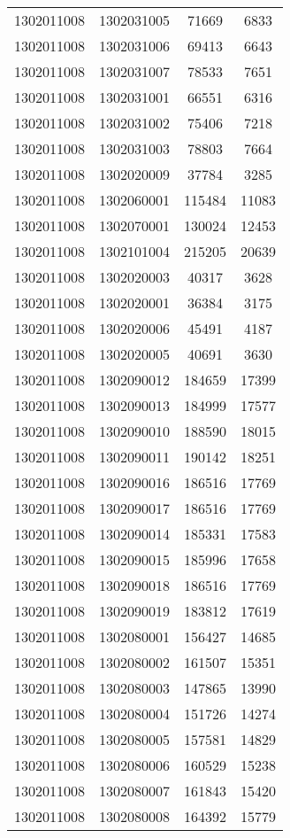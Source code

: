 \begin{longtable}{llcc}
1302011008 & 1302031005 & 71669 & 6833\\
1302011008 & 1302031006 & 69413 & 6643\\
1302011008 & 1302031007 & 78533 & 7651\\
1302011008 & 1302031001 & 66551 & 6316\\
1302011008 & 1302031002 & 75406 & 7218\\
1302011008 & 1302031003 & 78803 & 7664\\
1302011008 & 1302020009 & 37784 & 3285\\
1302011008 & 1302060001 & 115484 & 11083\\
1302011008 & 1302070001 & 130024 & 12453\\
1302011008 & 1302101004 & 215205 & 20639\\
1302011008 & 1302020003 & 40317 & 3628\\
1302011008 & 1302020001 & 36384 & 3175\\
1302011008 & 1302020006 & 45491 & 4187\\
1302011008 & 1302020005 & 40691 & 3630\\
1302011008 & 1302090012 & 184659 & 17399\\
1302011008 & 1302090013 & 184999 & 17577\\
1302011008 & 1302090010 & 188590 & 18015\\
1302011008 & 1302090011 & 190142 & 18251\\
1302011008 & 1302090016 & 186516 & 17769\\
1302011008 & 1302090017 & 186516 & 17769\\
1302011008 & 1302090014 & 185331 & 17583\\
1302011008 & 1302090015 & 185996 & 17658\\
1302011008 & 1302090018 & 186516 & 17769\\
1302011008 & 1302090019 & 183812 & 17619\\
1302011008 & 1302080001 & 156427 & 14685\\
1302011008 & 1302080002 & 161507 & 15351\\
1302011008 & 1302080003 & 147865 & 13990\\
1302011008 & 1302080004 & 151726 & 14274\\
1302011008 & 1302080005 & 157581 & 14829\\
1302011008 & 1302080006 & 160529 & 15238\\
1302011008 & 1302080007 & 161843 & 15420\\
1302011008 & 1302080008 & 164392 & 15779\\

\end{longtable}
